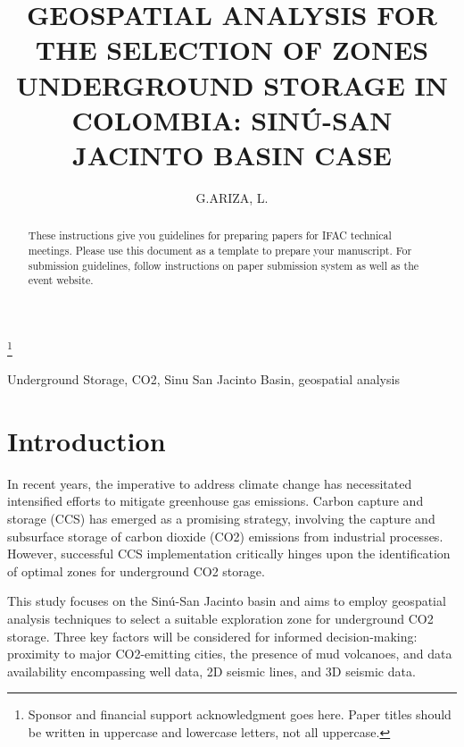 \documentclass{ifacconf}
\begin{document}
\begin{frontmatter}

\title{GEOSPATIAL ANALYSIS FOR THE SELECTION OF ZONES UNDERGROUND STORAGE IN COLOMBIA: SINÚ-SAN JACINTO BASIN CASE} 

\thanks[footnoteinfo]{Sponsor and financial support acknowledgment
goes here. Paper titles should be written in uppercase and lowercase
letters, not all uppercase.}

\author[First]{G.ARIZA, L.} 



\address[First]{Universidad Nacional de Colombia, sede Medellin (e-mail: anggarciaar@unal.edu.co).}


\begin{abstract}                %
These instructions give you guidelines for preparing papers for IFAC
technical meetings. Please use this document as a template to prepare
your manuscript. For submission guidelines, follow instructions on
paper submission system as well as the event website.
\end{abstract}

\begin{keyword}
Underground Storage, CO2, Sinu San Jacinto Basin, geospatial analysis
\end{keyword}

\end{frontmatter}

\section{Introduction}
In recent years, the imperative to address climate change has necessitated intensified efforts to mitigate greenhouse gas emissions. Carbon capture and storage (CCS) has emerged as a promising strategy, involving the capture and subsurface storage of carbon dioxide (CO2) emissions from industrial processes. However, successful CCS implementation critically hinges upon the identification of optimal zones for underground CO2 storage.

This study focuses on the Sinú-San Jacinto basin and aims to employ geospatial analysis techniques to select a suitable exploration zone for underground CO2 storage. Three key factors will be considered for informed decision-making: proximity to major CO2-emitting cities, the presence of mud volcanoes, and data availability encompassing well data, 2D seismic lines, and 3D seismic data.
\end{document}
